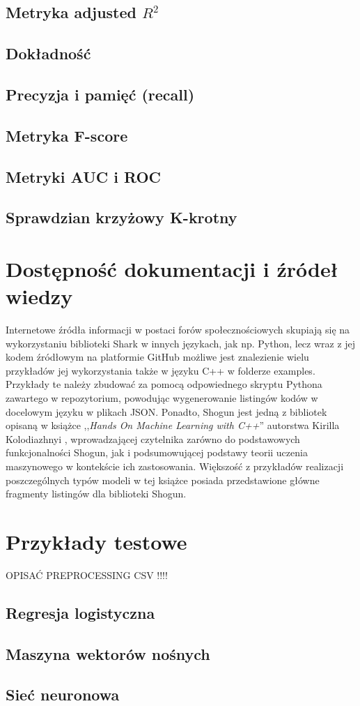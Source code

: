 \subsection{Metryka adjusted $R^2$}
\subsection{Dokładność}
\subsection{Precyzja i pamięć (recall)}
\subsection{Metryka F-score}
\subsection{Metryki AUC i ROC}

\subsection{Sprawdzian krzyżowy K-krotny}


\section{Dostępność dokumentacji i źródeł wiedzy}

Internetowe źródła informacji w postaci forów społecznościowych skupiają się na wykorzystaniu biblioteki Shark w innych językach, jak np. Python, lecz wraz z jej kodem źródłowym na platformie GitHub \cite{shogun:github} możliwe jest znalezienie wielu przykładów jej wykorzystania także w języku C++ w folderze examples. Przykłady te należy zbudować za pomocą odpowiednego skryptu Pythona zawartego w repozytorium, powodując wygenerowanie listingów kodów w docelowym języku w plikach JSON. Ponadto, Shogun jest jedną z bibliotek opisaną w książce ,,\textit{Hands On Machine Learning with C++}'' autorstwa Kirilla Kolodiazhnyi \cite{handsOnMachineLearning}, wprowadzającej czytelnika zarówno do podstawowych funkcjonalności Shogun, jak i podsumowującej podstawy teorii uczenia maszynowego w kontekście ich zastosowania. Większość z przykładów realizacji poszczególnych typów modeli w tej książce posiada przedstawione główne fragmenty listingów dla biblioteki Shogun.

\section{Przykłady testowe}

OPISAĆ PREPROCESSING CSV !!!!

\subsection{Regresja logistyczna}
\subsection{Maszyna wektorów nośnych}
\subsection{Sieć neuronowa}